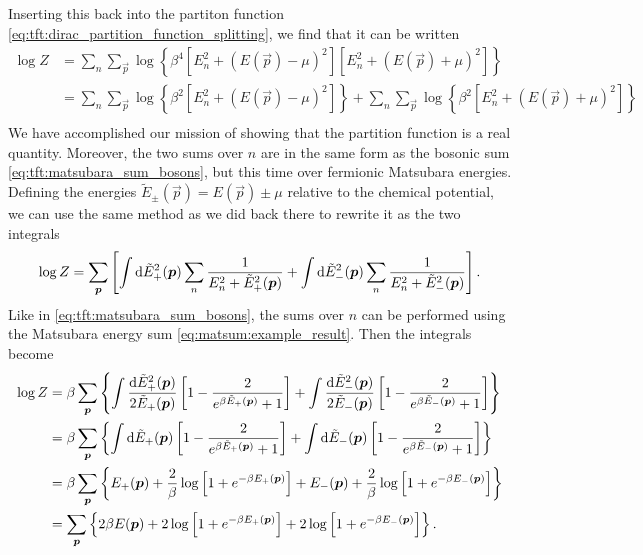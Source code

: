 Inserting this back into the partiton function \eqref{eq:tft:dirac_partition_function_splitting}, we find that it can be written
\begin{equation}
\begin{split}
	\log Z & = \sum_n \sum_\vec{p} \log \left\{ \beta^4 \left[ E_n^2 + (E(\vec{p}) - \mu)^2 \right] \left[ E_n^2 + (E(\vec{p}) + \mu)^2 \right] \right\} \\
	       & = \sum_n \sum_\vec{p} \log \left\{ \beta^2 \left[ E_n^2 + (E(\vec{p}) - \mu)^2 \right] \right\} + \sum_n \sum_\vec{p} \log \left\{ \beta^2 \left[ E_n^2 + (E(\vec{p}) + \mu)^2 \right] \right\} \\
\end{split}
\label{eq:tft:fermion_log_sum}
\end{equation}
We have accomplished our mission of showing that the partition function is a real quantity.
Moreover, the two sums over $n$ are in the same form as the bosonic sum \eqref{eq:tft:matsubara_sum_bosons}, but this time over fermionic Matsubara energies.
Defining the energies $\tilde E_\pm(\vec{p}) = E(\vec{p}) \pm \mu$ relative to the chemical potential, we can use the same method as we did back there to rewrite it as the two integrals
\begin{equation}
	\log Z = \sum_{\bm{p}} \left[ \int \mathop{}\!\mathrm{d} \tilde E_+^2({\bm{p}}) \sum_n \frac{1}{E_n^2 + \tilde E_+^2({\bm{p}})} +
	                             \int \mathop{}\!\mathrm{d} \tilde E_-^2({\bm{p}}) \sum_n \frac{1}{E_n^2 + \tilde E_-^2({\bm{p}})} \right] .
\label{eq:tft:matsubara_sum_fermions}
\end{equation}
Like in \eqref{eq:tft:matsubara_sum_bosons}, the sums over $n$ can be performed using the Matsubara energy sum \eqref{eq:matsum:example_result}.
Then the integrals become
\begin{equation}
\begin{split}
	\log Z &= \beta \sum_{\bm{p}} \left\{ \int \frac{\mathop{}\!\mathrm{d} \tilde E_+^2({\bm{p}})}{2 \tilde E_+({\bm{p}})} \left[ 1 - \frac{2}{e^{\beta \tilde E_+({\bm{p}})} + 1} \right] +
	                                     \int \frac{\mathop{}\!\mathrm{d} \tilde E_-^2({\bm{p}})}{2 \tilde E_-({\bm{p}})} \left[ 1 - \frac{2}{e^{\beta \tilde E_-({\bm{p}})} + 1} \right] \right\} \\
	       &= \beta \sum_{\bm{p}} \left\{ \int \mathop{}\!\mathrm{d} \tilde E_+({\bm{p}}) \left[ 1 - \frac{2}{e^{\beta \tilde E_+({\bm{p}})} + 1} \right] +
	                                     \int \mathop{}\!\mathrm{d} \tilde E_-({\bm{p}}) \left[ 1 - \frac{2}{e^{\beta \tilde E_-({\bm{p}})} + 1} \right] \right\} \\
	       &= \beta \sum_{\bm{p}} \left\{ E_+({\bm{p}}) + \frac{2}{\beta} \log \left[ 1 + e^{-\beta E_+({\bm{p}})} \right] +
	                                     E_-({\bm{p}}) + \frac{2}{\beta} \log \left[ 1 + e^{-\beta E_-({\bm{p}})} \right] \right\} \\
	       &=       \sum_{\bm{p}} \left\{ 2 \beta E({\bm{p}}) + 2 \log \left[ 1 + e^{-\beta E_+({\bm{p}})} \right] + 2 \log \left[ 1 + e^{-\beta E_-({\bm{p}})} \right] \right\} . \\
\end{split}
\end{equation}
